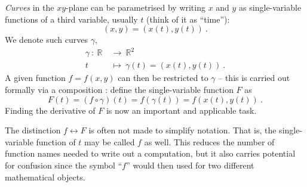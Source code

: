 \begin{remark}
\label{rem:composition}
\emph{Curves} in the $xy$-plane can be parametrised by writing $x$ and $y$ as single-variable functions of a third variable, usually $t$ (think of it as ``time''):
\[ (x,y) = (x(t),y(t)) \:. \]
We denote such curves $\gamma$,
\begin{equation*}
\begin{split}
\gamma \: : \: \mathbb{R} & \: \rightarrow \: \mathbb{R}^2 \\
t & \: \mapsto \: \gamma(t) = \left(x(t),y(t)\right) \:.
\end{split} 
\end{equation*}
A given function $f=f(x,y)$ can then be restricted to $\gamma$ -- this is carried out formally via a composition : define the single-variable function $F$ as
\[F(t) = \left(f\circ\gamma\right) (t) = f(\gamma(t)) = f(x(t),y(t)) \:. \]
Finding the derivative of $F$ is now an important and applicable task.

The distinction $f \leftrightarrow F$ is often not made to simplify notation. That is, the single-variable function of $t$ may be called $f$ as well. This reduces the number of function names needed to write out a computation, but it also carries potential for confusion since the symbol ``$f$'' would then used for two different mathematical objects. 
\end{remark}

